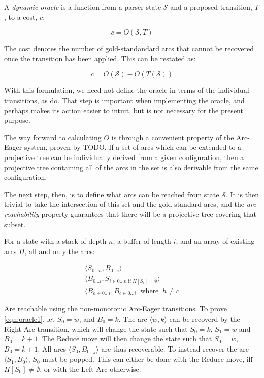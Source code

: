 \documentclass[11pt,letterpaper]{article}
\newcommand{\state}{\mathcal{S}}
\begin{document}
A \emph{dynamic oracle} is a function
from a parser state $\state$ and a proposed transition, $T$, to a cost, $c$:

\begin{equation}
c = O(\state, T)
\end{equation}

The cost denotes the number of gold-standandard arcs that cannot be
recovered once the transition has been applied. This can be restated as:

\begin{equation}
c = O(\state) - O(T(\state))
\end{equation}

With this formulation, we need not define the oracle in terms of the individual
transitions, as \citet{goldberg:12} do. That step is important when implementing
the oracle, and perhaps makes its action easier to intuit,
but is not necessary for the present purpose.

The way forward to calculating $O$ is through a
convenient property of the 
Arc-Eager system, proven by TODO.  If a
set of arcs which can be extended to a projective tree can be individually
derived from a given configuration, then a projective tree containing all of
the arcs in the set is also derivable from the same configuration.

The next step, then, is to define what arcs can be reached from state $\state$.
It is then trivial to take the intersection of this set and the gold-standard
arcs, and the \emph{arc reachability} property guarantees that there will be a
projective tree covering that subset.

For a state with a stack of depth $n$, a buffer of length $i$, and an array of
existing arcs $H$, all and only the arcs:

\begin{eqnarray}
    \langle S_{0...n}, B_{0...i}\rangle \label{eqn:oracle1} \\
    \langle B_{0...i}, S_{i \in {0...n}\;\mbox{if}\; H[S_i] = \emptyset } \rangle \label{eqn:oracle2}\\
    \langle B_{h \in {0...i}}, B_{c \in {0...i}}\;\; \mbox{where}\;\; h \neq c
\end{eqnarray}

Are reachable using the non-monotonic Arc-Eager transitions.
To prove \ref{eqn:oracle1}, let $S_0=w$, and $B_0=k$. The
arc $\langle w, k\rangle$ can be recoverd by the Right-Arc transition, which
will change the state such that $S_0=k$, $S_1=w$ and $B_0=k+1$. The Reduce
move will then change the state such that $S_0=w$, $B_0=k+1$. All arcs
$\langle S_0, B_{0...j}\rangle$ are thus recoverable. To instead recover the arc
$\langle S_1, B_{0}\rangle$, $S_0$ must be popped. This can either be done
with the Reduce move, iff $H[S_0] \neq \emptyset$, or with the Left-Arc otherwise.
\end{document}
